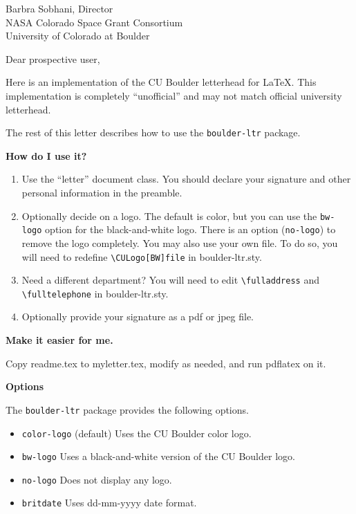\documentclass{letter}
\begin{document}
\begin{letter}
{Barbra Sobhani, Director\\
NASA Colorado Space Grant Consortium\\
University of Colorado at Boulder
}

\opening{Dear prospective user,}

Here is an implementation of the CU Boulder letterhead for \LaTeX.  This implementation is completely ``unofficial'' and may not match official university letterhead.  

The rest of this letter describes how to use the {\verb+boulder-ltr+} package.  

{\bf How do I use it?}
\begin{enumerate}

\item Use the ``letter'' document class.  You should declare your signature and other personal information in the preamble.  

\item Optionally decide on a logo.  The default is color, but you can use the {\verb+bw-logo+} option for the black-and-white logo.  There is an option ({\verb+no-logo+}) to remove the logo completely.  You may also use your own file.  To do so, you will need to redefine {\verb+\CULogo[BW]file+} in boulder-ltr.sty.

\item Need a different department? You will need to edit {\verb+\fulladdress+} and {\verb+\fulltelephone+} in boulder-ltr.sty.  

\item Optionally provide your signature as a pdf or jpeg file.

\end{enumerate}

{\bf Make it easier for me.}

Copy readme.tex to myletter.tex, modify as needed, and run pdflatex on it.

{\bf Options}

The {\verb+boulder-ltr+} package provides the following options.
\begin{itemize}
	\item {\verb+color-logo+} (default) Uses the CU Boulder color logo.
	\item {\verb+bw-logo+} Uses a black-and-white version of the CU Boulder logo.
	\item {\verb+no-logo+} Does not display any logo.
	\item {\verb+britdate+} Uses dd-mm-yyyy date format.
\end{itemize} 


\end{letter}
\end{document}

